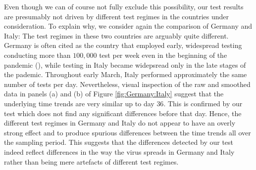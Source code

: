 \documentclass[a4paper,12pt]{article}
\numberwithin{equation}{section}
\begin{document}
Even though we can of course not fully exclude this possibility, our test results are presumably not driven by different test regimes in the countries under consideration. To explain why, we consider again the comparison of Germany and Italy: The test regimes in these two countries are arguably quite different. Germany is often cited as the country that employed early, widespread testing conducting more than $100,000$ test per week even in the beginning of the pandemic (\cite{Cohen2020}), while testing in Italy became widepsread only in the late stages of the pademic. Throughout early March, Italy performed approximately the same number of tests per day. %
Nevertheless, visual inspection of the raw and smoothed data in panels (a) and (b) of Figure \ref{fig:Germany:Italy} suggest that the underlying time trends are very similar up to day $36$. This is confirmed by our test which does not find any significant differences before that day. Hence, the different test regimes in Germany and Italy do not appear to have an overly strong effect and to produce spurious differences between the time trends all over the sampling period. This suggests that the differences detected by our test indeed reflect differences in the way the virus spreads in Germany and Italy rather than being mere artefacts of different test regimes. 




\end{document}
